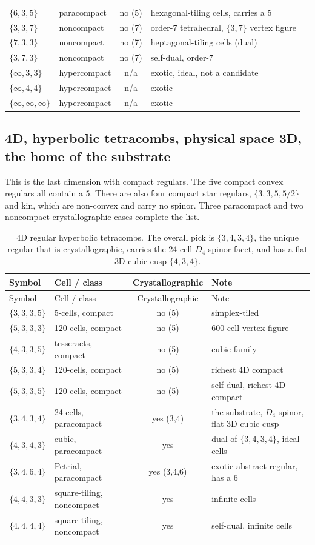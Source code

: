 {\begin{longtable}{l l c p{2.9in}}
$\{6,3,5\}$ & paracompact & no (5) & hexagonal-tiling cells, carries a 5 \\
$\{3,3,7\}$ & noncompact & no (7) & order-7 tetrahedral, $\{3,7\}$ vertex figure \\
$\{7,3,3\}$ & noncompact & no (7) & heptagonal-tiling cells (dual) \\
$\{3,7,3\}$ & noncompact & no (7) & self-dual, order-7 \\
$\{\infty,3,3\}$ & hypercompact & n/a & exotic, ideal, not a candidate \\
$\{\infty,4,4\}$ & hypercompact & n/a & exotic \\
$\{\infty,\infty,\infty\}$ & hypercompact & n/a & exotic \\
\end{longtable}}

\subsection{4D, hyperbolic tetracombs, physical space 3D, the home of the substrate}

This is the last dimension with compact regulars. The five compact convex regulars all contain a $5$. There are
also four compact star regulars, $\{3,3,5,5/2\}$ and kin, which are non-convex and carry no spinor. Three
paracompact and two noncompact crystallographic cases complete the list.

{\small
\begin{longtable}{l p{1.6in} c p{2.4in}}
\caption{4D regular hyperbolic tetracombs. The overall pick is $\{3,4,3,4\}$, the unique regular that is
crystallographic, carries the 24-cell $D_4$ spinor facet, and has a flat 3D cubic cusp $\{4,3,4\}$.}
\label{tab:catalog-4d}\\
\toprule
Symbol & Cell / class & Crystallographic & Note \\
\midrule
\endfirsthead
\toprule
Symbol & Cell / class & Crystallographic & Note \\
\midrule
\endhead
\bottomrule
\endfoot
$\{3,3,3,5\}$ & 5-cells, compact & no (5) & simplex-tiled \\
$\{5,3,3,3\}$ & 120-cells, compact & no (5) & 600-cell vertex figure \\
$\{4,3,3,5\}$ & tesseracts, compact & no (5) & cubic family \\
$\{5,3,3,4\}$ & 120-cells, compact & no (5) & richest 4D compact \\
$\{5,3,3,5\}$ & 120-cells, compact & no (5) & self-dual, richest 4D compact \\
$\{3,4,3,4\}$ & 24-cells, paracompact & yes (3,4) & the substrate, $D_4$ spinor, flat 3D cubic cusp \\
$\{4,3,4,3\}$ & cubic, paracompact & yes & dual of $\{3,4,3,4\}$, ideal cells \\
$\{3,4,6,4\}$ & Petrial, paracompact & yes (3,4,6) & exotic abstract regular, has a 6 \\
$\{4,4,3,3\}$ & square-tiling, noncompact & yes & infinite cells \\
$\{4,4,4,4\}$ & square-tiling, noncompact & yes & self-dual, infinite cells \\
\end{longtable}}

